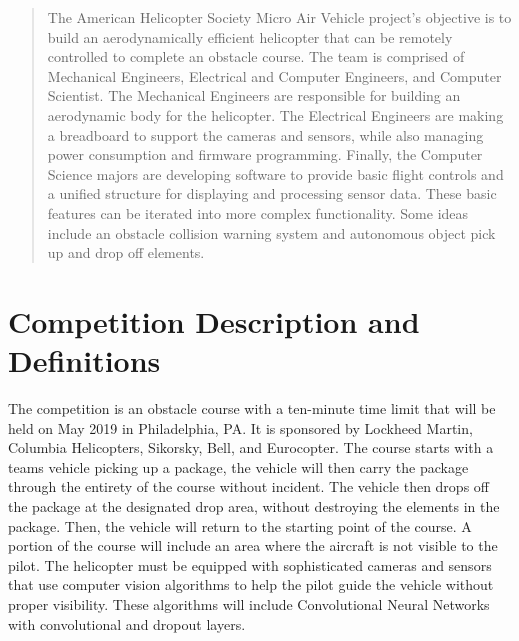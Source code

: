 \documentclass[onecolumn, oneside, letterpaper, draftclsnofoot, 10pt, compsoc]{IEEEtran}
\begin{document}
\begin{titlepage}
\begin{singlespace}
\begin{abstract}
The American Helicopter Society Micro Air Vehicle project's objective is to build an aerodynamically efficient helicopter that can be remotely controlled to complete an obstacle course. The team is comprised of Mechanical Engineers, Electrical and Computer Engineers, and Computer Scientist. The Mechanical Engineers are responsible for building an aerodynamic body for the helicopter. The Electrical Engineers are making a breadboard to support the cameras and sensors, while also managing power consumption and firmware programming. Finally, the Computer Science majors are developing software to provide basic flight controls and a unified structure for displaying and processing sensor data. These basic features can be iterated into more complex functionality. Some ideas include an obstacle collision warning system and autonomous object pick up and drop off elements.
        \end{abstract}
    \end{singlespace}
\end{titlepage}
\newpage
{}
\tableofcontents
\clearpage

\section{Competition Description and Definitions}
The competition is an obstacle course with a ten-minute time limit that will be held on May 2019 in Philadelphia, PA. It is sponsored by Lockheed Martin, Columbia Helicopters, Sikorsky, Bell, and Eurocopter. The course starts with a team\textquotesingle s vehicle picking up a package, the vehicle will then carry the package through the entirety of the course without incident. The vehicle then drops off the package at the designated drop area, without destroying the elements in the package. Then, the vehicle will return to the starting point of the course. A portion of the course will include an area where the aircraft is not visible to the pilot. The helicopter must be equipped with sophisticated cameras and sensors that use computer vision algorithms to help the pilot guide the vehicle without proper visibility. These algorithms will include Convolutional Neural Networks with convolutional and dropout layers.
\end{document}
